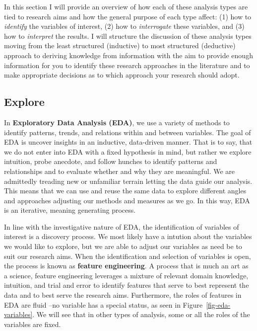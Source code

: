 \documentclass[
  letterpaper,
  DIV=11,
  numbers=noendperiod]{scrreport}
\theoremstyle{definition}
\theoremstyle{remark}
\begin{document}
In this section I will provide an overview of how each of these analysis
types are tied to research aims and how the general purpose of each type
affect: (1) how to \emph{identify} the variables of interest, (2) how to
\emph{interrogate} these variables, and (3) how to \emph{interpret} the
results. I will structure the discussion of these analysis types moving
from the least structured (inductive) to most structured (deductive)
approach to deriving knowledge from information with the aim to provide
enough information for you to identify these research approaches in the
literature and to make appropriate decisions as to which approach your
research should adopt.

\hypertarget{sec-aa-explore}{%
\subsection{Explore}\label{sec-aa-explore}}

In \textbf{Exploratory Data Analysis (EDA)}, we use a variety of methods
to identify patterns, trends, and relations within and between
variables. The goal of EDA is uncover insights in an inductive,
data-driven manner. That is to say, that we do not enter into EDA with a
fixed hypothesis in mind, but rather we explore intuition, probe
anecdote, and follow hunches to identify patterns and relationships and
to evaluate whether and why they are meaningful. We are admittedly
treading new or unfamiliar terrain letting the data guide our analysis.
This means that we can use and reuse the same data to explore different
angles and approaches adjusting our methods and measures as we go. In
this way, EDA is an iterative, meaning generating process.

In line with the investigative nature of EDA, the identification of
variables of interest is a discovery process. We most likely have a
intution about the variables we would like to explore, but we are able
to adjust our variables as need be to suit our research aims. When the
identification and selection of variables is open, the process is known
as \textbf{feature engineering}. A process that is much an art as a
science, feature engineering leverages a mixture of relevant domain
knowledge, intuition, and trial and error to identify features that
serve to best represent the data and to best serve the research aims.
Furthermore, the roles of features in EDA are fluid --no variable has a
special status, as seen in Figure~\ref{fig-eda-variables}. We will see
that in other types of analysis, some or all the roles of the variables
are fixed.
\end{document}
